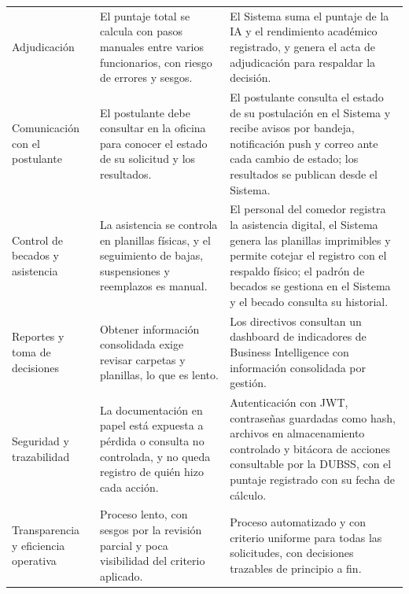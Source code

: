 \begin{longtable}{>{\raggedright\arraybackslash}p{2.8cm} >{\raggedright\arraybackslash}p{6.1cm} >{\raggedright\arraybackslash}p{6.1cm}}
Adjudicación & El puntaje total se calcula con pasos manuales entre varios funcionarios, con riesgo de errores y sesgos. & El Sistema suma el puntaje de la IA y el rendimiento académico registrado, y genera el acta de adjudicación para respaldar la decisión. \\
Comunicación con el postulante & El postulante debe consultar en la oficina para conocer el estado de su solicitud y los resultados. & El postulante consulta el estado de su postulación en el Sistema y recibe avisos por bandeja, notificación push y correo ante cada cambio de estado; los resultados se publican desde el Sistema. \\
Control de becados y asistencia & La asistencia se controla en planillas físicas, y el seguimiento de bajas, suspensiones y reemplazos es manual. & El personal del comedor registra la asistencia digital, el Sistema genera las planillas imprimibles y permite cotejar el registro con el respaldo físico; el padrón de becados se gestiona en el Sistema y el becado consulta su historial. \\
Reportes y toma de decisiones & Obtener información consolidada exige revisar carpetas y planillas, lo que es lento. & Los directivos consultan un dashboard de indicadores de Business Intelligence con información consolidada por gestión. \\
Seguridad y trazabilidad & La documentación en papel está expuesta a pérdida o consulta no controlada, y no queda registro de quién hizo cada acción. & Autenticación con JWT, contraseñas guardadas como hash, archivos en almacenamiento controlado y bitácora de acciones consultable por la DUBSS, con el puntaje registrado con su fecha de cálculo. \\
Transparencia y eficiencia operativa & Proceso lento, con sesgos por la revisión parcial y poca visibilidad del criterio aplicado. & Proceso automatizado y con criterio uniforme para todas las solicitudes, con decisiones trazables de principio a fin. \\
\end{longtable}
\endgroup
\addtocounter{table}{-1}
\vspace{-0.5\baselineskip}
